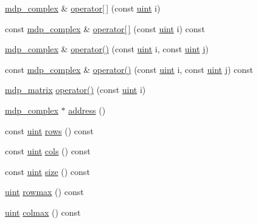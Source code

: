 \begin{DoxyCompactItemize}
\item 
\hyperlink{classmdp__complex}{mdp\_\-complex} \& \hyperlink{classmdp__matrix_af6008a99ddef98e8bbd072f624206a18}{operator\mbox{[}$\,$\mbox{]}} (const \hyperlink{mdp__global__vars_8h_a91ad9478d81a7aaf2593e8d9c3d06a14}{uint} i)
\item 
const \hyperlink{classmdp__complex}{mdp\_\-complex} \& \hyperlink{classmdp__matrix_abbfeb632d8fbd7467350e02221fbc892}{operator\mbox{[}$\,$\mbox{]}} (const \hyperlink{mdp__global__vars_8h_a91ad9478d81a7aaf2593e8d9c3d06a14}{uint} i) const 
\item 
\hyperlink{classmdp__complex}{mdp\_\-complex} \& \hyperlink{classmdp__matrix_a820c578eaf97324bec338827db42b8e6}{operator()} (const \hyperlink{mdp__global__vars_8h_a91ad9478d81a7aaf2593e8d9c3d06a14}{uint} i, const \hyperlink{mdp__global__vars_8h_a91ad9478d81a7aaf2593e8d9c3d06a14}{uint} j)
\item 
const \hyperlink{classmdp__complex}{mdp\_\-complex} \& \hyperlink{classmdp__matrix_a0081ae88c0b89ec503ff7fe37d40a76d}{operator()} (const \hyperlink{mdp__global__vars_8h_a91ad9478d81a7aaf2593e8d9c3d06a14}{uint} i, const \hyperlink{mdp__global__vars_8h_a91ad9478d81a7aaf2593e8d9c3d06a14}{uint} j) const 
\item 
\hyperlink{classmdp__matrix}{mdp\_\-matrix} \hyperlink{classmdp__matrix_aef809061e550a0587af45e098810c95e}{operator()} (const \hyperlink{mdp__global__vars_8h_a91ad9478d81a7aaf2593e8d9c3d06a14}{uint} i)
\item 
\hyperlink{classmdp__complex}{mdp\_\-complex} $\ast$ \hyperlink{classmdp__matrix_a557c3deb958c09b99f045df8d41a506e}{address} ()
\item 
const \hyperlink{mdp__global__vars_8h_a91ad9478d81a7aaf2593e8d9c3d06a14}{uint} \hyperlink{classmdp__matrix_a4df62af650e443ed541f87e1ff6579fe}{rows} () const 
\item 
const \hyperlink{mdp__global__vars_8h_a91ad9478d81a7aaf2593e8d9c3d06a14}{uint} \hyperlink{classmdp__matrix_a432ee1e1596f14d6b5899f857f5989e6}{cols} () const 
\item 
const \hyperlink{mdp__global__vars_8h_a91ad9478d81a7aaf2593e8d9c3d06a14}{uint} \hyperlink{classmdp__matrix_a5b2edbb37f2d2b54804b4259969827b2}{size} () const 
\item 
\hyperlink{mdp__global__vars_8h_a91ad9478d81a7aaf2593e8d9c3d06a14}{uint} \hyperlink{classmdp__matrix_a4c0ca28e65a33c17fe8de9a67b19604c}{rowmax} () const 
\item 
\hyperlink{mdp__global__vars_8h_a91ad9478d81a7aaf2593e8d9c3d06a14}{uint} \hyperlink{classmdp__matrix_a006f666092b7aea1180728216474d13e}{colmax} () const 

\end{DoxyCompactItemize}
